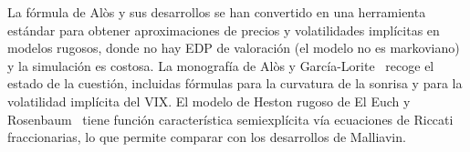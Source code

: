 \begin{observacion}
La fórmula de Alòs y sus desarrollos se han convertido en una herramienta
estándar para obtener aproximaciones de precios y volatilidades implícitas en modelos rugosos,
donde no hay EDP de valoración (el modelo no es markoviano) y la simulación es costosa. La
monografía de Alòs y García-Lorite~\cite{AlosGarciaLorite21} recoge el estado de la cuestión, incluidas fórmulas para la
curvatura de la sonrisa y para la volatilidad implícita del VIX. El modelo de Heston rugoso de
El Euch y Rosenbaum~\cite{ElEuchRosenbaum19} tiene función característica semiexplícita vía ecuaciones de Riccati
fraccionarias, lo que permite comparar con los desarrollos de Malliavin.
\end{observacion}
